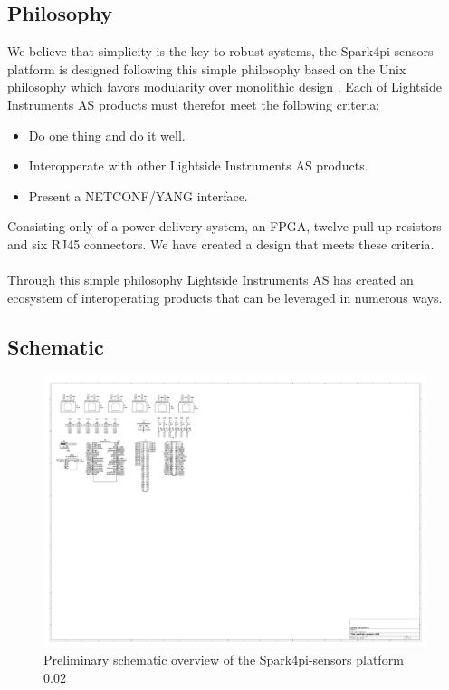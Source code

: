 \documentclass[12pt]{article}
\newcommand{\writersnote}[1]{\marginpar{\small{\textcolor{blue}{Writer's note:}} \scriptsize\textit{#1}}}
\begin{document}
\subsection{Philosophy}
We believe that simplicity is the key to robust systems, the Spark4pi-sensors platform is designed following this simple philosophy based on the 
Unix philosophy which favors modularity over monolithic design \cite{BasicsUnixPhilosophy}.
Each of Lightside Instruments AS products must therefor meet the following criteria:
\begin{itemize}
    \item Do one thing and do it well.
    \item Interopperate with other Lightside Instruments AS products.
    \item Present a NETCONF/YANG interface.
\end{itemize}
Consisting only of a power delivery system, an FPGA, twelve pull-up resistors and six RJ45 connectors. We have 
created a design that meets these criteria.
\\
\\
Through this simple philosophy Lightside Instruments AS has created an ecosystem of interoperating products that can be
leveraged in numerous ways.

\subsection{Schematic}
\begin{figure}[H]
    \begin{adjustwidth}{-1.5in}{-1in}
        \centering
        \includegraphics[width=\paperwidth]{schematic.png}
        \caption{Preliminary schematic overview of the Spark4pi-sensors platform 0.02}
    \end{adjustwidth}
\end{figure}
\end{document}
